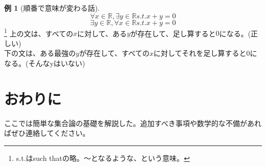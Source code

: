 \documentclass[unicode,12pt,report]{ltjsarticle}
\theoremstyle{definition}
\newtheorem{example}[definition]{例}
\begin{document}
\begin{example}[順番で意味が変わる話]
    $$\forall x \in \mathbb{R}, \exists y \in \mathbb{R} s.t. x + y = 0$$
    $$\exists y \in \mathbb{R}, \forall x \in \mathbb{R} s.t. x + y = 0$$   
    \footnote{s.t.はsuch thatの略。～となるような、という意味。}
    上の文は、すべての$x$に対して、ある$y$が存在して、足し算すると$0$になる。(正しい)\\
    下の文は、ある最強の$y$が存在して、すべての$x$に対してそれを足し算すると$0$になる。(そんなyはいない)
\end{example}

\section{おわりに}
ここでは簡単な集合論の基礎を解説した。追加すべき事項や数学的な不備があればぜひ連絡してください。
\end{document}
